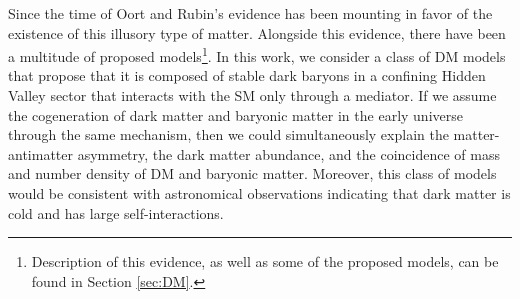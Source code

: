 

Since the time of Oort and Rubin's evidence has been mounting in favor of the existence of this illusory type of matter. Alongside this evidence, there have been a multitude of proposed models\footnote{Description of this evidence, as well as some of the proposed models, can be found in Section \ref{sec:DM}.}. In this work, we consider a class of DM models that propose that it is composed of stable dark baryons in a confining Hidden Valley sector that interacts with the SM only through a mediator. If we assume the cogeneration of dark matter and baryonic matter in the early universe through the same mechanism, then we could simultaneously explain the matter-antimatter asymmetry, the dark matter abundance, and the coincidence of mass and number density of DM and baryonic matter\cite{schwallerEmergingJets2015}. Moreover, this class of models would be consistent with astronomical observations indicating that dark matter is cold and has large self-interactions.

